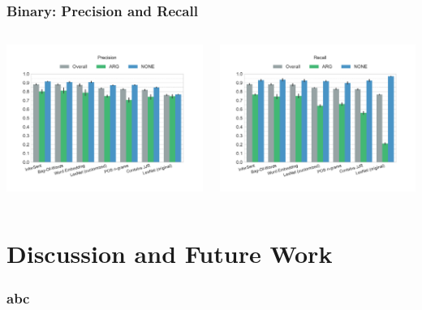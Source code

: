 \documentclass[11pt,aspectratio=169]{beamer}
\begin{document}
    \begin{frame}
        \frametitle{Binary: Precision and Recall}
        \begin{columns}[t]
            \column{2in}
            \centerline{\includegraphics[scale=0.31,trim={2cm 0 0 0},clip]{images/experiments/p-precision-True}}
            \column{2in}
            \centerline{\includegraphics[scale=0.31,trim={0 0 2cm 0},clip]{images/experiments/p-recall-True}}

        \end{columns}
    \end{frame}



    \section{Discussion and Future Work}
    \frame{\sectionpage}
    \begin{frame}
        \frametitle{abc}

    \end{frame}
\end{document}
